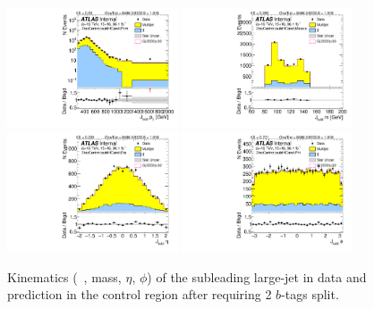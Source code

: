 \begin{figure}[htbp!]
\begin{center}
\includegraphics[width=0.45\textwidth,angle=-90]{figures/boosted/Control/b77_TwoTag_split_Control_sublHCand_Pt_m_1.pdf}
\includegraphics[width=0.45\textwidth,angle=-90]{figures/boosted/Control/b77_TwoTag_split_Control_sublHCand_Mass_s.pdf}\\
\includegraphics[width=0.45\textwidth,angle=-90]{figures/boosted/Control/b77_TwoTag_split_Control_sublHCand_Eta.pdf}
\includegraphics[width=0.45\textwidth,angle=-90]{figures/boosted/Control/b77_TwoTag_split_Control_sublHCand_Phi.pdf}
  \caption{Kinematics (\pt~, mass, $\eta$, $\phi$) of the subleading large-\R jet in data and prediction in the control region after requiring 2 $b$-tags split. }
  \label{fig:boosted-2bs-control-ak10-subl}
\end{center}
\end{figure}

